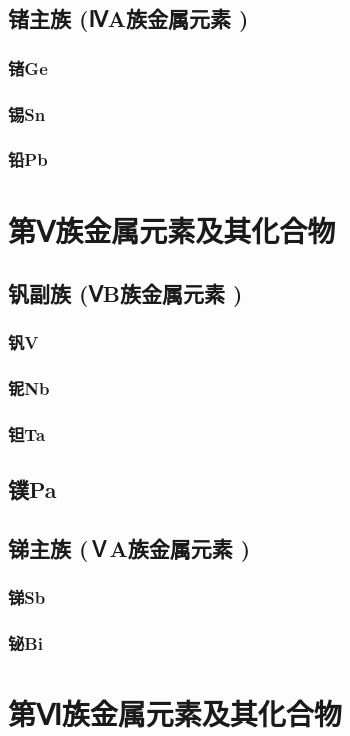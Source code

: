 \documentclass[UTF8]{../03-Chemistry}
\begin{document}
    \subsection{锗主族 (ⅣA族金属元素 )}
        \subsubsection{锗Ge}
        \subsubsection{锡Sn}
        \subsubsection{铅Pb}
\section{第Ⅴ族金属元素及其化合物}
    \subsection{钒副族 (ⅤB族金属元素 )}
        \subsubsection{钒V}
        \subsubsection{铌Nb}
        \subsubsection{钽Ta}
    \subsection{镤Pa}
    \subsection{锑主族 (ＶA族金属元素 )}
        \subsubsection{锑Sb}
        \subsubsection{铋Bi}
\section{第Ⅵ族金属元素及其化合物}
\end{document}
